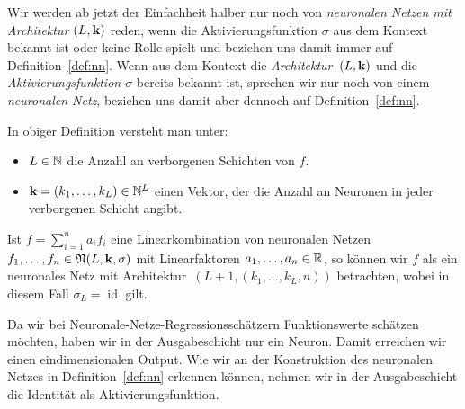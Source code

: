 Wir werden ab jetzt der Einfachheit halber nur noch von \emph{neuronalen Netzen mit Architektur $(L,\mathbf{k})$} reden, wenn die Aktivierungsfunktion $\sigma$ aus dem Kontext bekannt ist oder keine Rolle spielt und beziehen uns damit immer auf Definition~\ref{def:nn}. Wenn aus dem Kontext die \emph{Architektur~$(L,\mathbf{k})$} und die \emph{Aktivierungsfunktion $\sigma$} bereits bekannt ist, sprechen wir nur noch von einem \emph{neuronalen Netz}, beziehen uns damit aber dennoch auf Definition~\ref{def:nn}.
\begin{bemnumber}
In obiger Definition versteht man unter:
\begin{itemize}
\item $L \in \mathbb{N}$ die Anzahl an verborgenen Schichten von $f$.
\item $\mathbf{k} = (k_1,\dots,k_L) \in \mathbb{N}^L$ einen Vektor, der die Anzahl an Neuronen in jeder verborgenen Schicht angibt.
\end{itemize}
Ist $f = \sum_{i = 1}^n a_i f_i $ eine Linearkombination von neuronalen Netzen $f_1,\dots,f_n \in \mathfrak{N}(L, \mathbf{k}, \sigma)$ mit Linearfaktoren $a_1,\dots,a_n \in \mathbb{R}$, so können wir $f$ als ein neuronales Netz mit Architektur~$(L+1,(k_1,\dots,k_L,n))$ betrachten, wobei in diesem Fall $\sigma_L = \operatorname{id}$ gilt.
\end{bemnumber}
Da wir bei Neuronale-Netze-Regressionsschätzern Funktionswerte schätzen möchten, haben wir in der Ausgabeschicht nur ein Neuron. Damit erreichen wir einen eindimensionalen Output. Wie wir an der Konstruktion des neuronalen Netzes in Definition~\ref{def:nn} erkennen können, nehmen wir in der Ausgabeschicht die Identität als Aktivierungsfunktion.


